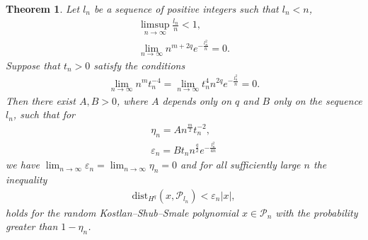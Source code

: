 \documentclass[10pt]{amsart}
\newtheorem{theorem}{Theorem}
\theoremstyle{remark}
\begin{document}
\begin{theorem}\label{lower}
Let $l_n$ be a sequence of positive integers such that $l_n<n$,
\begin{eqnarray}
\limsup_{n\to\infty}\frac{l_n}{n}<1,\label{boulnn}\\
\lim_{n\to\infty}n^{m+2q}e^{-\frac{l_n^2}{n}}=0.\label{lngrow}
\end{eqnarray}
Suppose that $t_n>0$ satisfy the conditions
\begin{eqnarray}\label{condt}
\lim_{n\to\infty}n^mt_n^{-4}
=\lim_{n\to\infty}t_n^4n^{2q}e^{-\frac{l_n^2}{n}}=0.
\end{eqnarray}
Then there exist $A,B>0$, where $A$ depends only on $q$ and $B$
only on the sequence $l_n$, such that for
\begin{eqnarray*}
\eta_n=An^{\frac{m}{2}}t_n^{-2},\\
{{\mathord{\varepsilon}}}_n=Bt_nn^{\frac{q}{2}}e^{-\frac{l_n^2}{4n}}
\end{eqnarray*}
we have $\lim_{n\to\infty}{{\mathord{\varepsilon}}}_n=\lim_{n\to\infty}\eta_n=0$ and for
all sufficiently large $n$ the inequality
\begin{eqnarray}\label{distvx}
{\mathrm{dist}}_{H^q}(x,{\mathcal{P}}_{l_n})<{{\mathord{\varepsilon}}}_n|x|,
\end{eqnarray}
holds for the random Kostlan--Shub--Smale polynomial $x\in{\mathcal{P}}_n$
with the probability greater than $1-\eta_n$.
\end{theorem}
\end{document}
